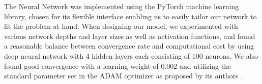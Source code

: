 \documentclass[reprint, english, nofootinbib]{revtex4-2}
\begin{document}
The Neural Network was implemented using the PyTorch \cite{NEURIPS2019_9015} machine learning library, chosen for its flexible interface enabling us to easily tailor our network to fit the problem at hand. When designing our model, we experimented with various network depths and layer sizes as well as activation functions, and found a reasonable balance between convergence rate and computational cost by using deep neural network with 4 hidden layers each consisting of 100 neurons. We also found good convergence with a learning weight of 0.002 and utilizing the standard parameter set in the ADAM optimizer as proposed by its authors \textcite{kingma2017adam}. 




\end{document}
